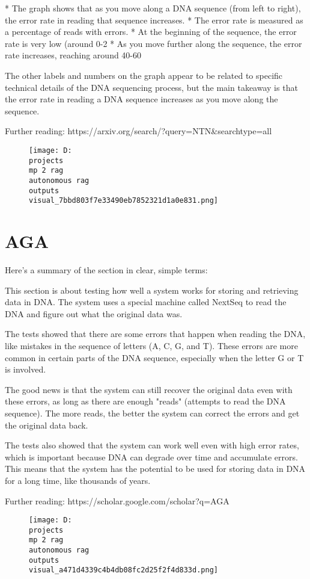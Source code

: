 \documentclass[12pt,a4paper]{article}
\begin{document}
* The graph shows that as you move along a DNA sequence (from left to right), the error rate in reading that sequence increases.
* The error rate is measured as a percentage of reads with errors.
* At the beginning of the sequence, the error rate is very low (around 0-2%
* As you move further along the sequence, the error rate increases, reaching around 40-60%

The other labels and numbers on the graph appear to be related to specific technical details of the DNA sequencing process, but the main takeaway is that the error rate in reading a DNA sequence increases as you move along the sequence.

Further reading: https://arxiv.org/search/?query=NTN&searchtype=all
\begin{figure}[h]
\centering
\texttt{[image: D:\\projects\\mp 2 rag\\autonomous rag\\outputs\\visual\_7bbd803f7e33490eb7852321d1a0e831.png]}
\end{figure}
\section{AGA}
Here's a summary of the section in clear, simple terms:

This section is about testing how well a system works for storing and retrieving data in DNA. The system uses a special machine called NextSeq to read the DNA and figure out what the original data was.

The tests showed that there are some errors that happen when reading the DNA, like mistakes in the sequence of letters (A, C, G, and T). These errors are more common in certain parts of the DNA sequence, especially when the letter G or T is involved.

The good news is that the system can still recover the original data even with these errors, as long as there are enough "reads" (attempts to read the DNA sequence). The more reads, the better the system can correct the errors and get the original data back.

The tests also showed that the system can work well even with high error rates, which is important because DNA can degrade over time and accumulate errors. This means that the system has the potential to be used for storing data in DNA for a long time, like thousands of years.

Further reading: https://scholar.google.com/scholar?q=AGA
\begin{figure}[h]
\centering
\texttt{[image: D:\\projects\\mp 2 rag\\autonomous rag\\outputs\\visual\_a471d4339c4b4db08fc2d25f2f4d833d.png]}
\end{figure}
\end{document}
